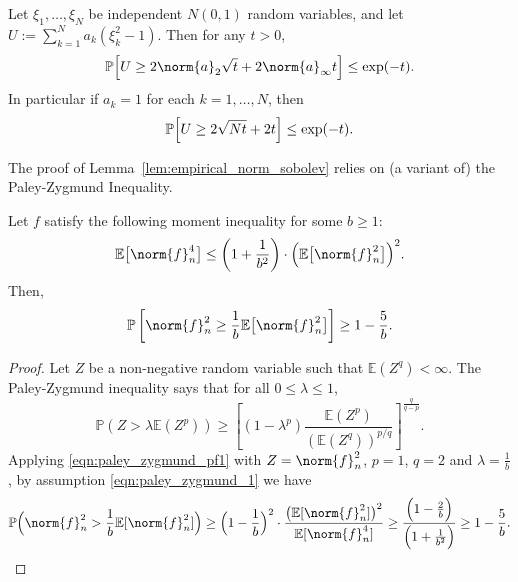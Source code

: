 \label{sec:concentration}
\begin{lemma}
	\label{lem:chi_square_bound}
	Let $\xi_1,\ldots,\xi_N$ be independent $N(0,1)$ random variables, and let $U := \sum_{k = 1}^{N} a_k(\xi_k^2 - 1)$.  Then for any $t > 0$,
	\begin{equation*}
	\Pbb\Bigl[U \geq 2 \norm{a}_2 \sqrt{t} + 2 \norm{a}_{\infty}t\Bigr] \leq \exp(-t).
	\end{equation*}
	In particular if $a_k = 1$ for each $k = 1,\ldots,N$, then
	\begin{equation*}
	\mathbb{P}\Bigl[U\geq 2\sqrt{N t} + 2t\Bigr] \leq \exp(-t).
	\end{equation*}
\end{lemma}

The proof of Lemma~\ref{lem:empirical_norm_sobolev} relies on (a variant of) the Paley-Zygmund Inequality.
\begin{lemma}
	\label{lem:paley_zygmund}
	Let $f$ satisfy the following moment inequality for some $b \geq 1$:
	\begin{equation}
	\label{eqn:paley_zygmund_1}
	\Ebb\bigl[\norm{f}_n^4\bigr] \leq \left(1 + \frac{1}{b^2}\right)\cdot\Bigl(\Ebb\bigl[\norm{f}_n^2\bigr]\Bigr)^2.
	\end{equation}
	Then,
	\begin{equation}
	\label{eqn:paley_zygmund_2}
	\mathbb{P}\left[\norm{f}_n^2 \geq \frac{1}{b} \Ebb\bigl[\norm{f}_n^2\bigr]\right] \geq 1 - \frac{5}{b}.
	\end{equation}
\end{lemma}
\begin{proof}
	Let $Z$ be a non-negative random variable such that $\mathbb{E}(Z^q) < \infty$. The Paley-Zygmund inequality says that for all $0 \leq \lambda \leq 1$,
	\begin{equation}
	\label{eqn:paley_zygmund_pf1}
	\mathbb{P}(Z > \lambda \mathbb{E}(Z^p)) \geq \left[(1 - \lambda^p) \frac{\mathbb{E}(Z^p)}{(\mathbb{E}(Z^q))^{p/q}}\right]^{\frac{q}{q - p}}.
	\end{equation}
	Applying \eqref{eqn:paley_zygmund_pf1} with $Z = \norm{f}_n^2$, $p = 1$, $q = 2$ and $\lambda = \frac{1}{b}$, by assumption \eqref{eqn:paley_zygmund_1} we have
	\begin{equation*}
	\mathbb{P}\Bigl(\norm{f}_n^2 > \frac{1}{b} \mathbb{E}[\norm{f}_n^2]\Bigr) \geq \Bigl(1 - \frac{1}{b}\Bigr)^2 \cdot  \frac{\bigl(\mathbb{E}[\norm{f}_n^2]\bigr)^2}{\mathbb{E}[\norm{f}_n^4]} \geq \frac{\Bigl(1 - \frac{2}{b}\Bigr)}{\Bigl(1 + \frac{1}{b^2}\Bigr)} \geq 1 - \frac{5}{b}.
	\end{equation*}
\end{proof}

